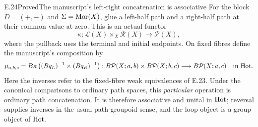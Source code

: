\begin{claim}{E.24}{Proved}{The manuscript's left-right concatenation is associative}
For the block $D=(+,-)$ and $\Sigma=\operatorname{Mor}(X)$, glue a left-half path and a right-half path at their common value at zero. This is an actual functor
\[
 \kappa:\mathcal L(X)\times_X\mathcal R(X)\longrightarrow\mathcal P(X),
\]
where the pullback uses the terminal and initial endpoints. On fixed fibres define the manuscript's composition by
\[
 \mu_{a,b,c}=B\kappa\,\bigl((Bq_L)^{-1}\times(Bq_R)^{-1}\bigr):
 B\mathcal P(X;a,b)\times B\mathcal P(X;b,c)
       \longrightarrow B\mathcal P(X;a,c)
 \quad\hbox{in }\mathrm{Hot}.
\]
Here the inverses refer to the fixed-fibre weak equivalences of E.23. Under the canonical comparisons to ordinary path spaces, this \emph{particular} operation is ordinary path concatenation. It is therefore associative and unital in $\mathrm{Hot}$; reversal supplies inverses in the usual path-groupoid sense, and the loop object is a group object of $\mathrm{Hot}$.
\end{claim}
